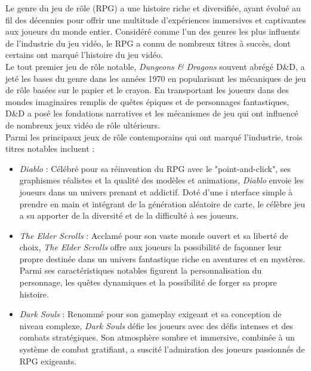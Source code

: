 Le genre du jeu de rôle (RPG) a une histoire riche et diversifiée, ayant évolué au fil des décennies pour offrir une multitude d'expériences immersives et captivantes aux joueurs du monde entier. 
Considéré comme l'un des genres les plus influents de l'industrie du jeu vidéo, le RPG a connu de nombreux titres à succès, dont certains ont marqué l'histoire du jeu vidéo.
\\

Le tout premier jeu de rôle notable, \textit{Dungeons \& Dragons} souvent abrégé D\&D, a jeté les bases du genre dans les années 1970 en popularisant les mécaniques de jeu de rôle basées sur le papier et le crayon.
En transportant les joueurs dans des mondes imaginaires remplis de quêtes épiques et de personnages fantastiques, D\&D a posé les fondations narratives et les mécanismes de jeu qui ont influencé de nombreux jeux vidéo de rôle ultérieurs.
\\

Parmi les principaux jeux de rôle contemporains qui ont marqué l'industrie, trois titres notables incluent :

\vspace{0.2cm}

\begin{itemize}
    \item \textit{Diablo} : Célébré pour sa réinvention du RPG avec le "point-and-click", ses graphismes réalistes et la qualité des modèles et animations, \textit{Diablo} envoie les joueurs dans un univers prenant et addictif.
    Doté d'une i nterface simple à prendre en main et intégrant de la génération aléatoire de carte, le célèbre jeu a su apporter de la diversité et de la difficulté à ses joueurs. \\

    \item \textit{The Elder Scrolls} : Acclamé pour son vaste monde ouvert et sa liberté de choix, \textit{The Elder Scrolls} offre aux joueurs la possibilité de façonner leur propre destinée dans un univers fantastique riche en aventures et en mystères.
    Parmi ses caractéristiques notables figurent la personnalisation du personnage, les quêtes dynamiques et la possibilité de forger sa propre histoire. \\
    
    \item \textit{Dark Souls} : Renommé pour son gameplay exigeant et sa conception de niveau complexe, \textit{Dark Souls} défie les joueurs avec des défis intenses et des combats stratégiques. Son atmosphère sombre et immersive, combinée à un système de combat gratifiant, a suscité l'admiration des joueurs passionnés de RPG exigeants.

\end{itemize} 

